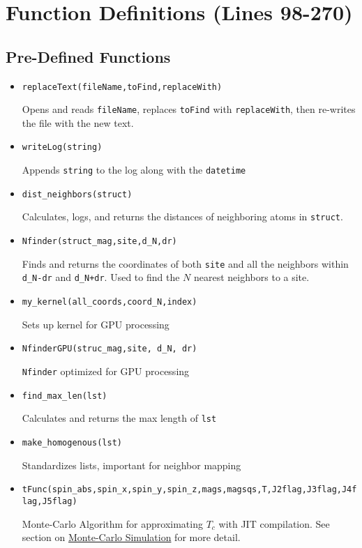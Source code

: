 \documentclass[12pt]{article}
\begin{document}
\section*{Function Definitions (Lines 98-270)}
\subsection*{Pre-Defined Functions}
\begin{itemize}
    \item \texttt{replaceText(fileName,toFind,replaceWith)} 
    
    
    Opens and reads \texttt{fileName}, replaces \texttt{toFind} with \texttt{replaceWith}, then re-writes the file with the new text. 
    
    \item \texttt{writeLog(string)} 
    
    Appends \texttt{string} to the log along with the \texttt{datetime}
    
    \item \texttt{dist_neighbors(struct)}
    
    Calculates, logs, and returns the distances of neighboring atoms in \texttt{struct}. 
    
    \item \texttt{Nfinder(struct_mag,site,d_N,dr)}
    
    Finds and returns the coordinates of both \texttt{site} and all the neighbors within \texttt{d_N-dr} and \texttt{d_N+dr}. Used to find the $N$ nearest neighbors to a site. 
    
    \item \texttt{my_kernel(all_coords,coord_N,index)}
    
    Sets up kernel for GPU processing
    
    \item \texttt{NfinderGPU(struc_mag,site, d_N, dr)}
    
    \texttt{Nfinder} optimized for GPU processing
    
    \item \texttt{find_max_len(lst)}
    
    Calculates and returns the max length of \texttt{lst}
    
    \item \texttt{make_homogenous(lst)}
    
    Standardizes lists, important for neighbor mapping
    \item \texttt{tFunc(spin_abs,spin_x,spin_y,spin_z,mags,magsqs,T,J2flag,J3flag,J4flag,J5flag)}
    
    Monte-Carlo Algorithm for approximating $T_c$ with JIT compilation. See section on \hyperref[sec:tFunc]{Monte-Carlo Simulation} for more detail. 
\end{itemize}
\end{document}
